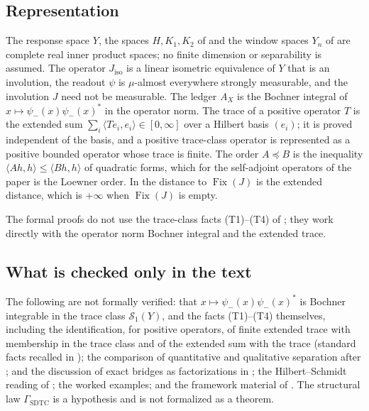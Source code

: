\documentclass[11pt]{article}
\DeclareMathOperator{\Fix}{Fix}
\newcommand{\psim}{\psi_{-}}
\newcommand{\AX}{A_{X}}
\newcommand{\Jiso}{J_{\mathrm{iso}}}
\newcommand{\GamSDTC}{\Gamma_{\mathrm{SDTC}}}
\theoremstyle{definition}
\begin{document}
\subsection*{Representation}

The response space \(Y\), the spaces \(H,K_1,K_2\) of
 and the window
spaces \(Y_n\) of 
are complete real inner product spaces; no finite dimension or
separability is assumed.  The operator \(\Jiso\) is a linear isometric
equivalence of \(Y\) that is an involution, the readout \(\psi\) is
\(\mu\)-almost everywhere strongly measurable, and the involution \(J\)
need not be measurable.  The ledger \(\AX\) is the Bochner integral of
\(x\mapsto\psim(x)\psim(x)^*\) in the operator norm.  The trace of a
positive operator \(T\) is the extended sum
\(\sum_i\langle Te_i,e_i\rangle\in[0,\infty]\) over a Hilbert basis
\((e_i)\); it is proved independent of the basis, and a positive
trace-class operator is represented as a positive bounded operator whose
trace is finite.  The order \(A\preceq B\) is the inequality
\(\langle Ah,h\rangle\leq\langle Bh,h\rangle\) of quadratic forms, which
for the self-adjoint operators of the paper is the Loewner order.  In
 the distance to
\(\Fix(J)\) is the extended distance, which is \(+\infty\) when
\(\Fix(J)\) is empty.

The formal proofs do not use the trace-class facts (T1)--(T4) of
; they work directly with the operator
norm Bochner integral and the extended trace.

\subsection*{What is checked only in the text}

The following are not formally verified: that \(x\mapsto\psim(x)\psim(x)^*\)
is Bochner integrable in the trace class \(\mathcal S_1(Y)\), and the
facts (T1)--(T4) themselves, including the identification, for positive
operators, of finite extended trace with membership in the trace class
and of the extended sum with the trace (standard facts recalled in
); the comparison of quantitative and
qualitative separation after
;
 and the discussion of
exact bridges as factorizations in ; the
Hilbert--Schmidt reading of
; the worked
examples; and the framework material of .  The
structural law \(\GamSDTC\) is a hypothesis and is not formalized as a
theorem.
\end{document}

